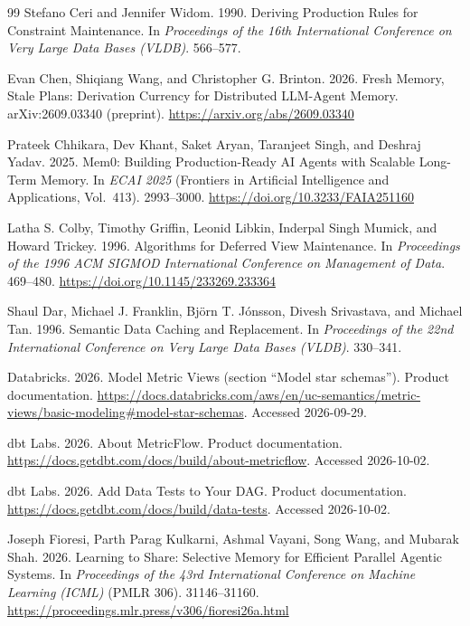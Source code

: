 \begin{thebibliography}{99}
Stefano Ceri and Jennifer Widom. 1990. Deriving Production Rules for Constraint Maintenance. In \emph{Proceedings of the 16th International Conference on Very Large Data Bases (VLDB)}. 566--577.

Evan Chen, Shiqiang Wang, and Christopher G. Brinton. 2026. Fresh Memory, Stale Plans: Derivation Currency for Distributed LLM-Agent Memory. arXiv:2609.03340 (preprint). \url{https://arxiv.org/abs/2609.03340}

Prateek Chhikara, Dev Khant, Saket Aryan, Taranjeet Singh, and Deshraj Yadav. 2025. Mem0: Building Production-Ready AI Agents with Scalable Long-Term Memory. In \emph{ECAI 2025} (Frontiers in Artificial Intelligence and Applications, Vol.~413). 2993--3000. \url{https://doi.org/10.3233/FAIA251160}

Latha S. Colby, Timothy Griffin, Leonid Libkin, Inderpal Singh Mumick, and Howard Trickey. 1996. Algorithms for Deferred View Maintenance. In \emph{Proceedings of the 1996 ACM SIGMOD International Conference on Management of Data}. 469--480. \url{https://doi.org/10.1145/233269.233364}

Shaul Dar, Michael J. Franklin, Bj{\"o}rn T. J{\'o}nsson, Divesh Srivastava, and Michael Tan. 1996. Semantic Data Caching and Replacement. In \emph{Proceedings of the 22nd International Conference on Very Large Data Bases (VLDB)}. 330--341.

Databricks. 2026. Model Metric Views (section ``Model star schemas''). Product documentation. \url{https://docs.databricks.com/aws/en/uc-semantics/metric-views/basic-modeling#model-star-schemas}. Accessed 2026-09-29.

dbt Labs. 2026. About MetricFlow. Product documentation. \url{https://docs.getdbt.com/docs/build/about-metricflow}. Accessed 2026-10-02.

dbt Labs. 2026. Add Data Tests to Your DAG. Product documentation. \url{https://docs.getdbt.com/docs/build/data-tests}. Accessed 2026-10-02.

Joseph Fioresi, Parth Parag Kulkarni, Ashmal Vayani, Song Wang, and Mubarak Shah. 2026. Learning to Share: Selective Memory for Efficient Parallel Agentic Systems. In \emph{Proceedings of the 43rd International Conference on Machine Learning (ICML)} (PMLR 306). 31146--31160. \url{https://proceedings.mlr.press/v306/fioresi26a.html}


\end{thebibliography}
